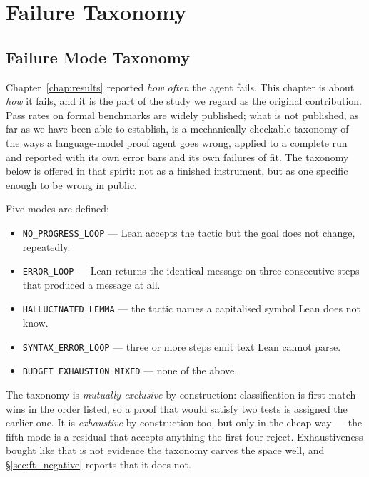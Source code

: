\chapter{Failure Taxonomy}
\label{chap:failure_taxonomy}

\section{Failure Mode Taxonomy}
\label{sec:ft_taxonomy}

Chapter~\ref{chap:results} reported \emph{how often} the agent fails.
This chapter is about \emph{how} it fails, and it is the part of the study we
regard as the original contribution.
Pass rates on formal benchmarks are widely published; what is not published, as
far as we have been able to establish, is a mechanically checkable taxonomy of
the ways a language-model proof agent goes wrong, applied to a complete run and
reported with its own error bars and its own failures of fit.
The taxonomy below is offered in that spirit: not as a finished instrument, but
as one specific enough to be wrong in public.

Five modes are defined:

\begin{itemize}
  \item \texttt{NO\_PROGRESS\_LOOP} --- Lean accepts the tactic but the goal
        does not change, repeatedly.
  \item \texttt{ERROR\_LOOP} --- Lean returns the identical message on three
        consecutive steps that produced a message at all.
  \item \texttt{HALLUCINATED\_LEMMA} --- the tactic names a capitalised symbol
        Lean does not know.
  \item \texttt{SYNTAX\_ERROR\_LOOP} --- three or more steps emit text Lean
        cannot parse.
  \item \texttt{BUDGET\_EXHAUSTION\_MIXED} --- none of the above.
\end{itemize}

The taxonomy is \emph{mutually exclusive} by construction: classification is
first-match-wins in the order listed, so a proof that would satisfy two tests
is assigned the earlier one. It is \emph{exhaustive} by construction too, but
only in the cheap way --- the fifth mode is a residual that accepts anything the
first four reject. Exhaustiveness bought like that is not evidence the taxonomy
carves the space well, and \S\ref{sec:ft_negative} reports that it does not.

